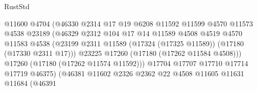 \begin{lexlean}{RustStd}
\begin{coremodule}
{\begin{coremodule}
{{{{{{{{{{{{{{{{{{{{{{{{{{{{{{{{{{{{{{{{{{{{{{{{{{{{{{{                                          @11600
                                          @4704
                                          (@46330
                                            @2314
                                            @17
                                            @19
                                            @6208
                                            @11592
                                            @11599
                                            @4570
                                            @11573
                                            @4538
                                            @23189
                                            (@46329
                                              @2312
                                              @104
                                              @17
                                              @14
                                              @11589
                                              @4508
                                              @4519
                                              @4570
                                              @11583
                                              @4538
                                              (@23199
                                                @2311
                                                @11589
                                                (@17324 (@17325 @11589))
                                                (@17180 (@17330 @2311 @17)))
                                              @23225
                                              @17260
                                              (@17180 (@17262 @11584 @4508)))
                                            @17260
                                            (@17180 (@17262 @11574 @11592)))
                                          @17704
                                          @17707
                                          @17710
                                          @17714
                                          @17719
                                          @46375)
                                        (@46381
                                          @11602
                                          @2326
                                          @2362
                                          @22
                                          @4508
                                          @11605
                                          @11631
                                          @11684
                                          (@46391
}}}}}}}}}}}}}}}}}}}}}}}}}}}}}}}}}}}}}}}}}}}}}}}}}}}}}}}
\end{coremodule}}
\end{coremodule}
\end{lexlean}
